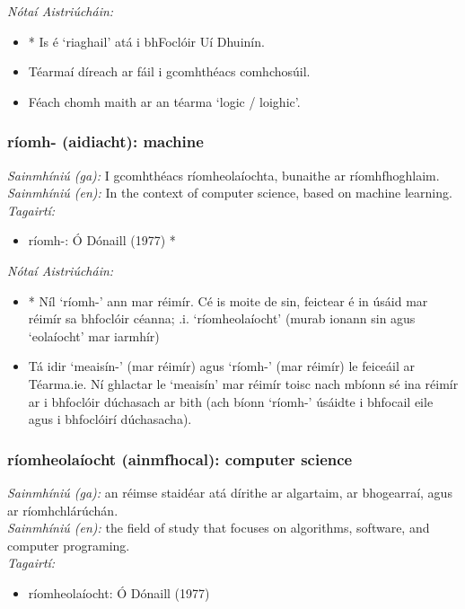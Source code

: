 \documentclass{article}
\begin{document}
 \noindent \textit{Nótaí Aistriúcháin:}
\begin{itemize}
	\item * Is é `riaghail' atá i bhFoclóir Uí Dhuinín.
	\item Téarmaí díreach ar fáil i gcomhthéacs comhchosúil.
	\item Féach chomh maith ar an téarma `logic / loighic'.
\end{itemize}


\subsubsection*{ríomh- (aidiacht): machine}
 \noindent \textit{Sainmhíniú (ga):} I gcomhthéacs ríomheolaíochta, bunaithe ar ríomhfhoghlaim.
\\
 \noindent \textit{Sainmhíniú (en):} In the context of computer science, based on machine learning.
\\
 \noindent \textit{Tagairtí:}
\begin{itemize}
	\item ríomh-: Ó Dónaill (1977) \cite{odonaill}*
\end{itemize}

 \noindent \textit{Nótaí Aistriúcháin:}
\begin{itemize}
	\item * Níl `ríomh-' ann mar réimír. Cé is moite de sin, feictear é in úsáid mar réimír sa bhfoclóir céanna; .i. `ríomheolaíocht' (murab ionann sin agus `eolaíocht' mar iarmhír)
	\item Tá idir `meaisín-' (mar réimír) agus `ríomh-' (mar réimír) le feiceáil ar Téarma.ie. Ní ghlactar le `meaisín' mar réimír toisc nach mbíonn sé ina réimír ar i bhfoclóir dúchasach ar bith (ach bíonn `ríomh-' úsáidte i bhfocail eile agus i bhfoclóirí dúchasacha).
\end{itemize}


\subsubsection*{ríomheolaíocht (ainmfhocal): computer science}
 \noindent \textit{Sainmhíniú (ga):} an réimse staidéar atá dírithe ar algartaim, ar bhogearraí, agus ar ríomhchlárúchán.
\\
 \noindent \textit{Sainmhíniú (en):} the field of study that focuses on algorithms, software, and computer programing.
\\
 \noindent \textit{Tagairtí:}
\begin{itemize}
	\item ríomheolaíocht: Ó Dónaill (1977) \cite{odonaill}
\end{itemize}
\end{document}
